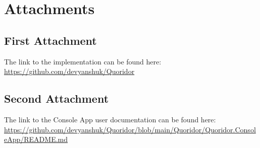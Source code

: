 \documentclass[12pt,a4paper]{report}
\begin{document}



\tableofcontents














\printglossaries


\appendix
\chapter{Attachments}

\section{First Attachment}
\label{app:repository}
The link to the implementation can be found here: 
\url{https://github.com/devyanshuk/Quoridor}


\section{Second Attachment}
\label{app:consoleapp}
The link to the Console App user documentation can be found here: \url{https://github.com/devyanshuk/Quoridor/blob/main/Quoridor/Quoridor.ConsoleApp/README.md}
\end{document}

